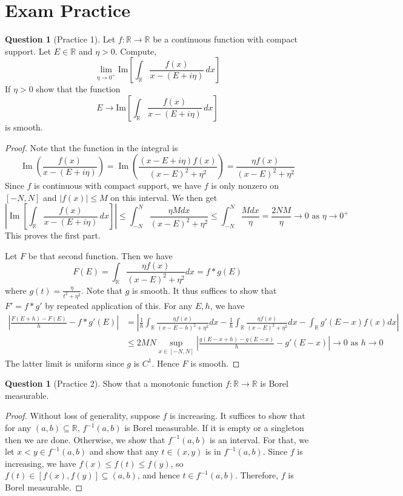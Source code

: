 \documentclass{article}
\newcommand{\R}{\mathbb{R}}
\renewcommand{\Im}{\operatorname{Im}}
\theoremstyle{definition} %
\numberwithin{thm}{section} %
\theoremstyle{definition} %
\newtheorem{question}[thm]{Question}
\begin{document}
\section{Exam Practice}

\begin{question}[Practice 1]
Let $f : \mathbb{R} \to \mathbb{R}$ be a continuous function with compact support. Let $E \in \mathbb{R}$ and $\eta > 0$. Compute,
\[
\lim_{\eta \to 0^+} \mathrm{Im} \left[ \int_{\mathbb{R}} \frac{f(x)}{x - (E + i \eta)} \, dx \right]
\]
If $\eta > 0$ show that the function
\[
E \to \mathrm{Im} \left[ \int_{\mathbb{R}} \frac{f(x)}{x - (E + i \eta)} \, dx \right]
\]
is smooth.
\end{question}
\begin{proof}
Note that the function in the integral is 
\[ \Im\left(\frac{f(x)}{x - (E + i \eta)}\right) = \Im\left(\frac{(x - E + i\eta)f(x)}{(x - E)^2 + \eta^2}\right) = \frac{\eta f(x)}{(x - E)^2 + \eta^2} \]
Since $f$ is continuous with compact support, we have $f$ is only nonzero on $[-N, N]$ and $|f(x)| \leq M$ on this interval. We then get 
\[ \left|\Im\left[ \int_{\mathbb{R}} \frac{f(x)}{x - (E + i \eta)} \, dx \right]\right| \leq \int_{-N}^N \frac{\eta Mdx}{(x - E)^2 + \eta^2} \leq \int_{-N}^N \frac{Mdx}{\eta} = \frac{2NM}{\eta} \to 0 \text{ as } \eta \to 0^+  \]
This proves the first part.

Let $F$ be that second function. Then we have 
\[ F(E) = \int_\R \frac{\eta f(x)}{(x - E)^2 + \eta^2} dx = f * g(E) \]
where $g(t) = \frac{\eta}{t^2 + \eta^2}$. Note that $g$ is smooth. It thus suffices to show that $F' = f * g'$ by repeated application of this. For any $E, h$, we have 
\begin{align*}
    \left|\frac{F(E + h) - F(E)}{h} - f*g'(E)\right|
    &= \left|\frac{1}{h}\int_\R \frac{\eta f(x)}{(x - E - h)^2 + \eta^2} dx - \frac{1}{h}\int_\R \frac{\eta f(x)}{(x - E)^2 + \eta^2} dx - \int_\R g'(E - x)f(x)dx\right| \\
    &\leq 2MN \sup_{x \in [-N, N]}\left|\frac{g(E - x + h) - g(E - x)}{h} - g'(E - x)\right| \to 0 \text{ as } h \to 0
\end{align*}
The latter limit is uniform since $g$ is $C^1$. Hence $F$ is smooth. 
\end{proof}

\begin{question}[Practice 2]
Show that a monotonic function $f : \mathbb{R} \to \mathbb{R}$ is Borel measurable.
\end{question}
\begin{proof}
Without loss of generality, suppose $f$ is increasing. It suffices to show that for any $(a, b) \subseteq \R$, $f^{-1}(a, b)$ is Borel measurable. If it is empty or a singleton then we are done. Otherwise, we show that $f^{-1}(a, b)$ is an interval. For that, we let $x < y \in f^{-1}(a, b)$ and show that any $t \in (x, y)$ is in $f^{-1}(a, b)$. Since $f$ is increasing, we have $f(x) \leq f(t) \leq f(y)$, so $f(t) \in [f(x), f(y)] \subseteq (a, b)$, and hence $t \in f^{-1}(a, b)$. Therefore, $f$ is Borel measurable.
\end{proof}
\end{document}
